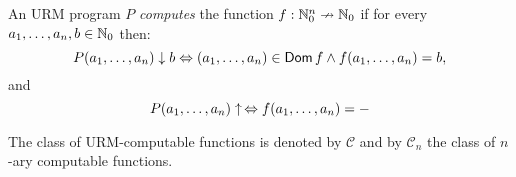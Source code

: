 
\begin{definition}
	An URM program $P$ \emph{computes} the function $f : \mathbb{N}_0^n \nrightarrow \mathbb{N}_0$ if for every $a_1, \ldots, a_n, b \in \mathbb{N}_0$ then:
	\begin{equation*}
		P(a_1, \ldots, a_n) \downarrow b \Leftrightarrow (a_1, \ldots, a_n) \in \operatorname{\mathsf{Dom}} f \land f(a_1, \ldots, a_n) = b,	
	\end{equation*}
	and
	\begin{equation*}
		P(a_1, \ldots, a_n) \uparrow \, \Leftrightarrow f(a_1, \ldots, a_n) = \--	
	\end{equation*}
\end{definition}
The class of URM-computable functions is denoted by $\mathcal{C}$ and by $\mathcal{C}_n$ the class of $n$-ary computable functions. 
